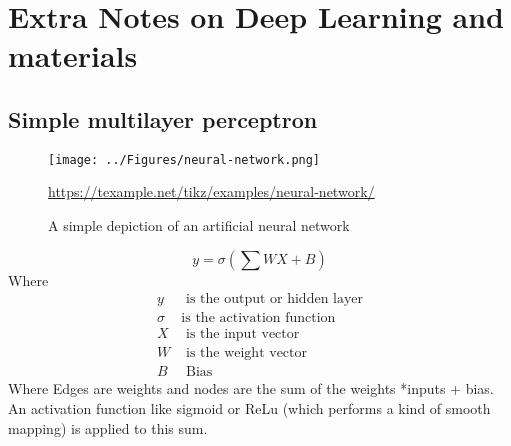 

\chapter{Extra Notes on Deep Learning and materials} %

\label{AppendixA} %

\section{Simple multilayer perceptron}

\begin{figure}[h]
	\texttt{[image: ../Figures/neural-network.png]}
	\caption[An ANN]{A simple depiction of an artificial neural network} \url{https://texample.net/tikz/examples/neural-network/}
\label{fig:appendix-mlp}
\end{figure}

\begin{equation*}
	y =  \sigma\left(\sum WX + B\right)
\end{equation*}
Where
\begin{align*}
	y &  \text{ is the output or hidden layer} \\
	\sigma &  \text{is the activation function} \\
	X &  \text{ is the input vector} \\
	W &  \text{ is the weight vector} \\
	B &  \text{ Bias}
\end{align*}
Where Edges are weights and nodes are the sum of the weights *inputs + bias. An activation function like sigmoid or ReLu (which performs a kind of smooth mapping) is applied to this sum.

